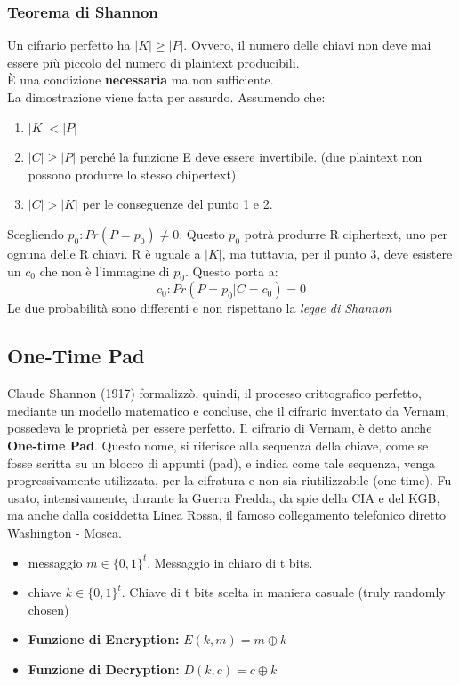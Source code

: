 \documentclass[a4paper,12pt]{article}
\begin{document}
\subsubsection{Teorema di Shannon}
Un cifrario perfetto ha $ |K| \geq |P| $.
Ovvero, il numero delle chiavi non deve mai essere più piccolo del numero di plaintext producibili. \\
È una condizione \textbf{necessaria} ma non sufficiente. \\
La dimostrazione viene fatta per assurdo. Assumendo che:
\begin{enumerate}
	\item $|K| < |P|$
	\item $|C| \geq |P|$ perché la funzione E deve essere invertibile. (due plaintext non possono produrre lo stesso chipertext)
	\item $|C| > |K|$ per le conseguenze del punto 1 e 2.
\end{enumerate}
Scegliendo $p_0 : Pr(P = p_0) \neq 0$. Questo $p_0$ potrà produrre R ciphertext, uno per ognuna delle R chiavi.
R è uguale a $|K|$, ma tuttavia, per il punto 3, deve esistere un $c_0$ che non è l'immagine di $p_0$. 
Questo porta a:
$$ c_0 : Pr(P = p_0 | C = c_0) = 0 $$ 
Le due probabilità sono differenti e non rispettano la \textit{legge di Shannon}

\subsection{One-Time Pad}
Claude Shannon (1917) formalizzò, quindi, il processo crittografico perfetto, mediante un modello matematico e concluse, che il cifrario inventato da Vernam, possedeva le proprietà per essere perfetto.
Il cifrario di Vernam, è detto anche \textbf{One-time Pad}. Questo nome, si riferisce alla sequenza della chiave, come se fosse scritta su un blocco di appunti (pad), e indica come tale sequenza, venga progressivamente utilizzata, per la cifratura e non sia riutilizzabile (one-time).
Fu usato, intensivamente, durante la Guerra Fredda, da spie della CIA e del KGB, ma anche dalla cosiddetta Linea Rossa, il famoso collegamento telefonico diretto Washington - Mosca. \\

\begin{itemize}
	\item messaggio $m \in \{0,1\}^t$. Messaggio in chiaro di t bits.
	\item chiave $k \in \{0,1\}^t$. Chiave di t bits scelta in maniera casuale (truly randomly chosen)
	\item \textbf{Funzione di Encryption: }$E(k, m) = m \oplus k$
	\item \textbf{Funzione di Decryption: }$D(k, c) = c \oplus k$
\end{itemize}
\end{document}
